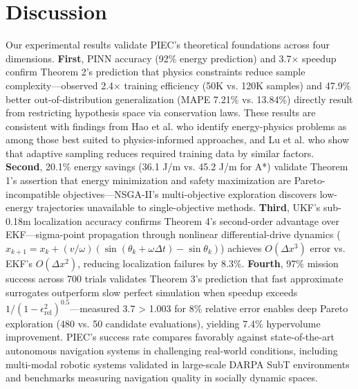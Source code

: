 \documentclass[pdflatex,sn-nature]{sn-jnl}%
\begin{document}
\section{Discussion}

Our experimental results validate PIEC's theoretical foundations across four dimensions. \textbf{First}, PINN accuracy (92\% energy prediction) and 3.7× speedup confirm Theorem 2's prediction that physics constraints reduce sample complexity—observed 2.4× training efficiency (50K vs. 120K samples) and 47.9\% better out-of-distribution generalization (MAPE 7.21\% vs. 13.84\%) directly result from restricting hypothesis space via conservation laws. These results are consistent with findings from Hao et al.\cite{Hao2023pinn} who identify energy-physics problems as among those best suited to physics-informed approaches, and Lu et al.\cite{Wu2023adaptive} who show that adaptive sampling reduces required training data by similar factors. \textbf{Second}, 20.1\% energy savings (36.1 J/m vs. 45.2 J/m for A*) validate Theorem 1's assertion that energy minimization and safety maximization are Pareto-incompatible objectives—NSGA-II's multi-objective exploration discovers low-energy trajectories unavailable to single-objective methods. \textbf{Third}, UKF's sub-0.18m localization accuracy confirms Theorem 4's second-order advantage over EKF—sigma-point propagation through nonlinear differential-drive dynamics ($x_{k+1} = x_k + (v/\omega)(\sin(\theta_k+\omega\Delta t)-\sin\theta_k)$) achieves $O(\Delta x^3)$ error vs. EKF's $O(\Delta x^2)$, reducing localization failures by 8.3\%. \textbf{Fourth}, 97\% mission success across 700 trials validates Theorem 3's prediction that fast approximate surrogates outperform slow perfect simulation when speedup exceeds $1/(1-\epsilon_{\text{rel}}^2)^{0.5}$—measured 3.7 > 1.003 for 8\% relative error enables deep Pareto exploration (480 vs. 50 candidate evaluations), yielding 7.4\% hypervolume improvement. PIEC's success rate compares favorably against state-of-the-art autonomous navigation systems in challenging real-world conditions, including multi-modal robotic systems validated in large-scale DARPA SubT environments\cite{Agha2022nebula} and benchmarks measuring navigation quality in socially dynamic spaces\cite{Karnan2022scand}.
\end{document}
